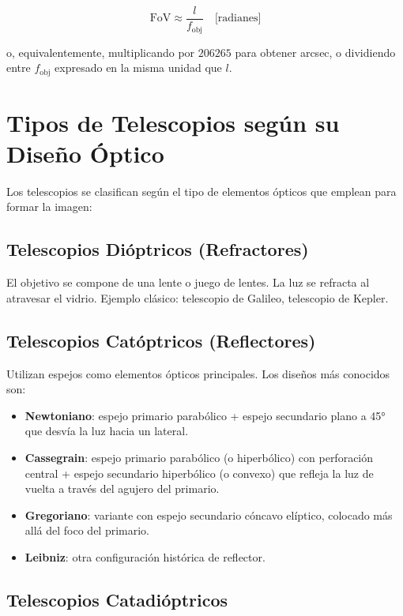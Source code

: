$$\text{FoV} \approx \frac{l}{f_{\text{obj}}} \quad \text{[radianes]}$$

o, equivalentemente, multiplicando por $206265$ para obtener arcsec, o dividiendo entre $f_{\text{obj}}$ expresado en la misma unidad que $l$.



\section{Tipos de Telescopios según su Diseño Óptico}

Los telescopios se clasifican según el tipo de elementos ópticos que emplean para formar la imagen:

\subsection{Telescopios Dióptricos (Refractores)}

El objetivo se compone de una lente o juego de lentes. La luz se refracta al atravesar el vidrio. Ejemplo clásico: telescopio de Galileo, telescopio de Kepler.

\subsection{Telescopios Catóptricos (Reflectores)}

Utilizan espejos como elementos ópticos principales. Los diseños más conocidos son:

\begin{itemize}
    \item \textbf{Newtoniano}: espejo primario parabólico + espejo secundario plano a 45° que desvía la luz hacia un lateral.
    \item \textbf{Cassegrain}: espejo primario parabólico (o hiperbólico) con perforación central + espejo secundario hiperbólico (o convexo) que refleja la luz de vuelta a través del agujero del primario.
    \item \textbf{Gregoriano}: variante con espejo secundario cóncavo elíptico, colocado más allá del foco del primario.
    \item \textbf{Leibniz}: otra configuración histórica de reflector.
\end{itemize}





\subsection{Telescopios Catadióptricos}

